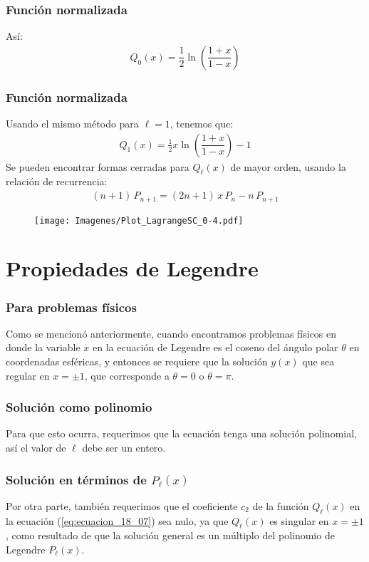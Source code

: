 \documentclass[12pt]{beamer}
\begin{document}
\begin{frame}
\frametitle{Función normalizada}
Así:
\pause
\begin{align*}
Q_{0} (x) = \dfrac{1}{2} \ln \left( \dfrac{1 + x}{1 - x} \right)
\end{align*}
\end{frame}
\begin{frame}
\frametitle{Función normalizada}
Usando el mismo método para $\ell = 1$, tenemos que:
\pause
\begin{align*}
Q_{1} (x) =  \frac{1}{2} x \ln \left( \dfrac{1 + x}{1 - x} \right) - 1
\end{align*}
\pause
Se pueden encontrar formas cerradas para $Q_{\ell} (x)$ de mayor orden, usando la relación de recurrencia:
\pause
\begin{align*}
(n + 1) \, P_{n+1} = (2 n + 1) \, x \, P_{n} - n \, P_{n+1}
\end{align*}
\end{frame}
\begin{frame}[plain]
\begin{figure}
    \centering
    \texttt{[image: Imagenes/Plot\_LagrangeSC\_0-4.pdf]}
\end{figure}
\end{frame}
  
\section{Propiedades de Legendre}

\begin{frame}
\frametitle{Para problemas físicos}
Como se mencionó anteriormente, cuando encontramos problemas físicos en donde la variable $x$ en la ecuación de Legendre es el coseno del ángulo polar $\theta$ en coordenadas esféricas, \pause y entonces se requiere que la solución $y (x)$ que sea regular en $x = \pm 1$, que corresponde a $\theta = 0$ o $\theta = \pi$. 
\end{frame}
\begin{frame}
\frametitle{Solución como polinomio}
Para que esto ocurra, requerimos que la ecuación tenga una solución polinomial, así el valor de $\ell$ debe ser un entero.
\end{frame}
\begin{frame}
\frametitle{Solución en términos de $P_{\ell} (x)$}
Por otra parte, también requerimos que el coeficiente $c_{2}$ de la función $Q_{\ell}(x)$ en la ecuación (\ref{eq:ecuacion_18_07}) sea nulo, ya que $Q_{\ell}(x)$ es singular en $x = \pm 1$, \pause como resultado de que la solución general es un múltiplo del polinomio de Legendre $P_{\ell} (x)$.
\end{frame}
\end{document}
